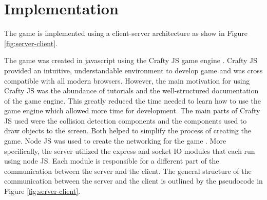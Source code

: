 \section{Implementation}

The game is implemented using a client-server architecture as show in
Figure \ref{fig:server-client}.









% 



The game was created in javascript using the Crafty JS game engine
\cite{craftyJS}. Crafty JS provided an intuitive, understandable
environment to develop game and was cross compatible with all modern
browsers. However, the main motivation for using Crafty JS was the
abundance of tutorials and the well-structured documentation of the
game engine. This greatly reduced the time needed to learn how to use
the game engine which allowed more time for development.  The main
parts of Crafty JS used were the collision detection components and
the components used to draw objects to the screen. Both helped to
simplify the process of creating the game.  Node JS was used to create
the networking for the game \cite{nodeJS}. More specifically, the
server utilized the express and socket IO modules that each run using
node JS. Each module is responsible for a different part of the
communication between the server and the client. The general structure
of the communication between the server and the client is outlined by
the pseudocode in Figure \ref{fig:server-client}.

